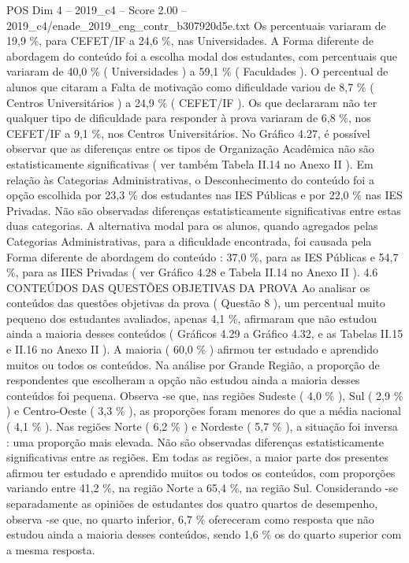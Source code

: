 \begin{textsample}{POS Dim 4 – 2019\_c4 – Score 2.00 – 2019\_c4/enade\_2019\_eng\_contr\_b307920d5e.txt}
Os percentuais variaram de 19,9 \%, para CEFET/IF a 24,6 \%, nas Universidades.
A Forma diferente de abordagem do conteúdo foi a escolha modal dos estudantes, com percentuais que variaram de 40,0 \% ( Universidades ) a 59,1 \% ( Faculdades ).
O percentual de alunos que citaram a Falta de motivação como dificuldade variou de 8,7 \% ( Centros Universitários ) a 24,9 \% ( CEFET/IF ).
Os que declararam não ter qualquer tipo de dificuldade para responder à prova variaram de 6,8 \%, nos CEFET/IF a 9,1 \%, nos Centros Universitários.
No Gráfico 4.27, é possível observar que as diferenças entre os tipos de Organização Acadêmica não são estatisticamente significativas ( ver também Tabela II.14 no Anexo II ).
Em relação às Categorias Administrativas, o Desconhecimento do conteúdo foi a opção escolhida por 23,3 \% dos estudantes nas IES Públicas e por 22,0 \% nas IES Privadas.
Não são observadas diferenças estatisticamente significativas entre estas duas categorias.
A alternativa modal para os alunos, quando agregados pelas Categorias Administrativas, para a dificuldade encontrada, foi causada pela Forma diferente de abordagem do conteúdo : 37,0 \%, para as IES Públicas e 54,7 \%, para as IIES Privadas ( ver Gráfico 4.28 e Tabela II.14 no Anexo II ). 4.6 CONTEÚDOS DAS QUESTÕES OBJETIVAS DA PROVA Ao analisar os conteúdos das questões objetivas da prova ( Questão 8 ), um percentual muito pequeno dos estudantes avaliados, apenas 4,1 \%, afirmaram que não estudou ainda a maioria desses conteúdos ( Gráficos 4.29 a Gráfico 4.32, e as Tabelas II.15 e II.16 no Anexo II ).
A maioria ( 60,0 \% ) afirmou ter estudado e aprendido muitos ou todos os conteúdos.
Na análise por Grande Região, a proporção de respondentes que escolheram a opção não estudou ainda a maioria desses conteúdos foi pequena.
Observa -se que, nas regiões Sudeste ( 4,0 \% ), Sul ( 2,9 \% ) e Centro-Oeste ( 3,3 \% ), as proporções foram menores do que a média nacional ( 4,1 \% ).
Nas regiões Norte ( 6,2 \% ) e Nordeste ( 5,7 \% ), a situação foi inversa : uma proporção mais elevada.
Não são observadas diferenças estatisticamente significativas entre as regiões.
Em todas as regiões, a maior parte dos presentes afirmou ter estudado e aprendido muitos ou todos os conteúdos, com proporções variando entre 41,2 \%, na região Norte a 65,4 \%, na região Sul.
Considerando -se separadamente as opiniões de estudantes dos quatro quartos de desempenho, observa -se que, no quarto inferior, 6,7 \% ofereceram como resposta que não estudou ainda a maioria desses conteúdos, sendo 1,6 \% os do quarto superior com a mesma resposta.

\end{textsample}
